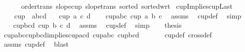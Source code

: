 \begin{isabellebody}
\ \ \ \ \ \ order{\isachardot}{\kern0pt}trans\ slope{\isacharunderscore}{\kern0pt}cup{}\ slope{\isacharunderscore}{\kern0pt}trans{\isacharparenleft}{\kern0pt}{}{\isacharparenright}{\kern0pt}\ sorted{}\ sorted{\isacharunderscore}{\kern0pt}wrt{}{\isacharparenright}{\kern0pt}%
\endisatagproof
{\isafoldproof}%
%
\isadelimproof
\isanewline
%
\endisadelimproof
\isanewline
{}\isamarkupfalse%
\ cup{}Impliescup{}Last{\isacharcolon}{\kern0pt}\isanewline
\ \ \ \ {\isachardoublequoteopen}cup\ {}\ {\isacharbrackleft}{\kern0pt}a{\isacharcomma}{\kern0pt}b{\isacharcomma}{\kern0pt}c{\isacharcomma}{\kern0pt}d{\isacharbrackright}{\kern0pt}{\isachardoublequoteclose}\isanewline
\ \ \ {\isachardoublequoteopen}cup{}\ a\ c\ d{\isachardoublequoteclose}\isanewline
%
\isadelimproof
%
\endisadelimproof
%
\isatagproof
{}\isamarkupfalse%
{\isacharminus}{\kern0pt}\isanewline
\ \ \isamarkupfalse%
\ cup{\isacharunderscore}{\kern0pt}abc{\isacharcolon}{\kern0pt}\ {\isachardoublequoteopen}cup{}\ a\ b\ c{\isachardoublequoteclose}\ \isamarkupfalse%
\ assms\ \isamarkupfalse%
\ cup{\isacharunderscore}{\kern0pt}def\ \isamarkupfalse%
\ simp\isanewline
\ \ \isamarkupfalse%
\ cup{\isacharunderscore}{\kern0pt}bcd{\isacharcolon}{\kern0pt}\ {\isachardoublequoteopen}cup{}\ b\ c\ d{\isachardoublequoteclose}\ \isamarkupfalse%
\ assms\ \isamarkupfalse%
\ cup{\isacharunderscore}{\kern0pt}def\ \isamarkupfalse%
\ simp\isanewline
\ \ \isamarkupfalse%
\ {\isacharquery}{\kern0pt}thesis\ \isamarkupfalse%
\ cup{\isacharunderscore}{\kern0pt}abc{\isacharunderscore}{\kern0pt}cup{\isacharunderscore}{\kern0pt}bcd{\isacharunderscore}{\kern0pt}implies{\isacharunderscore}{\kern0pt}cup{\isacharunderscore}{\kern0pt}acd\ cup{\isacharunderscore}{\kern0pt}abc\ cup{\isacharunderscore}{\kern0pt}bcd\ \isanewline
\ \ \ \ \isamarkupfalse%
\ cup{}{\isacharunderscore}{\kern0pt}def\ cross{}{\isacharunderscore}{\kern0pt}def\ \isanewline
\ \ \ \ \isamarkupfalse%
\ assms\ cup{\isacharunderscore}{\kern0pt}def\ \isamarkupfalse%
\ blast\isanewline
{}\isamarkupfalse%
%
\endisatagproof
{\isafoldproof}%
%
\isadelimproof
\isanewline
%

\end{isabellebody}
